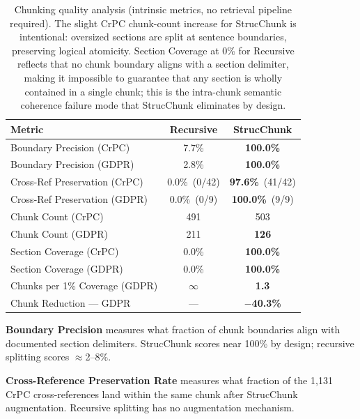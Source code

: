 \documentclass[sn-mathphys,Numbered]{sn-jnl}%
\begin{document}
\begin{table}[htbp]
\centering
\begin{tabular}{lcc}
\toprule
\textbf{Metric} & \textbf{Recursive} & \textbf{StrucChunk} \\
\midrule
Boundary Precision (CrPC)           & 7.7\%          & \textbf{100.0\%} \\
Boundary Precision (GDPR)           & 2.8\%          & \textbf{100.0\%} \\
Cross-Ref Preservation (CrPC)       & 0.0\%\ (0/42)  & \textbf{97.6\%}\ (41/42) \\
Cross-Ref Preservation (GDPR)       & 0.0\%\ (0/9)   & \textbf{100.0\%}\ (9/9) \\
Chunk Count (CrPC)                  & 491            & 503 \\
Chunk Count (GDPR)                  & 211            & \textbf{126} \\
Section Coverage (CrPC)             & 0.0\%          & \textbf{100.0\%} \\
Section Coverage (GDPR)             & 0.0\%          & \textbf{100.0\%} \\
Chunks per 1\% Coverage (GDPR)      & $\infty$       & \textbf{1.3} \\
Chunk Reduction --- GDPR            & ---            & \textbf{$-$40.3\%} \\
\bottomrule
\end{tabular}
\caption{Chunking quality analysis (intrinsic metrics, no retrieval
  pipeline required).  The slight CrPC chunk-count increase for StrucChunk
  is intentional: oversized sections are split at sentence boundaries,
  preserving logical atomicity.  Section Coverage at 0\% for Recursive
  reflects that no chunk boundary aligns with a section delimiter, making
  it impossible to guarantee that any section is wholly contained in a
  single chunk; this is the intra-chunk semantic coherence failure mode
  that StrucChunk eliminates by design.}
\label{tab:chunk_quality}
\end{table}

\textbf{Boundary Precision} measures what fraction of chunk boundaries
align with documented section delimiters.  StrucChunk scores near 100\%
by design; recursive splitting scores $\approx$2--8\%.

\textbf{Cross-Reference Preservation Rate} measures what fraction of the
1,131 CrPC cross-references land within the same chunk after StrucChunk
augmentation.  Recursive splitting has no augmentation mechanism.
\end{document}
